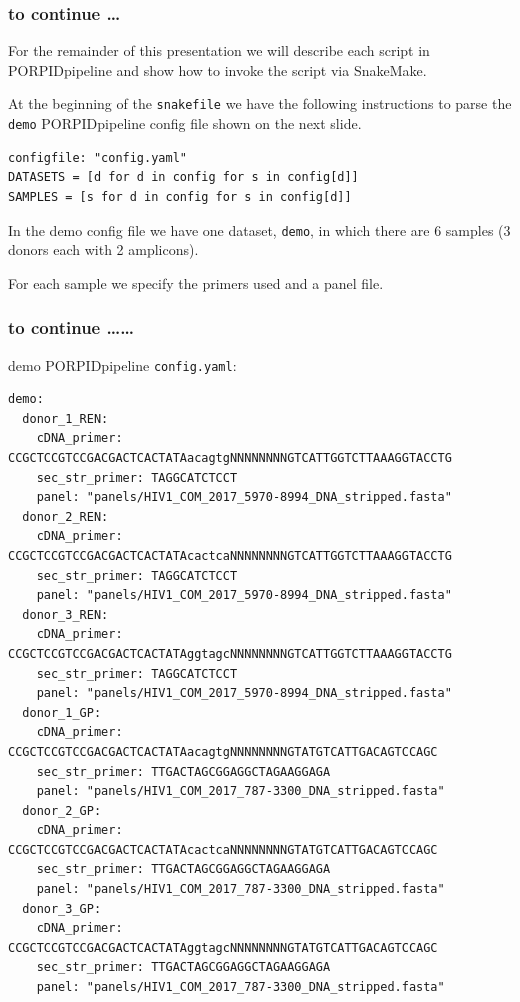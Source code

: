 \documentclass{beamer}
\begin{document}
\begin{frame}[fragile]
\frametitle{to continue \ldots }

\alert<1> 

For the remainder of this presentation we will describe each
script in PORPIDpipeline and show how to invoke
the script via SnakeMake.

\bigskip
At the beginning of the {\tt snakefile} we have the following instructions 
to parse the {\tt demo} PORPIDpipeline config file shown on the next slide.

\begin{tiny}
\begin{verbatim}
configfile: "config.yaml"
DATASETS = [d for d in config for s in config[d]]
SAMPLES = [s for d in config for s in config[d]] 
\end{verbatim}
\end{tiny}

\bigskip
In the demo config file we have one dataset, {\tt demo}, in which there
are 6 samples (3 donors each with 2 amplicons).

\bigskip
For each sample we specify the primers used and a panel file.

\end{frame}

\begin{frame}[fragile]
\frametitle{to continue \ldots  \ldots}

\alert<1> 

demo PORPIDpipeline  {\tt config.yaml}:

\begin{tiny}
\begin{verbatim}
demo:
  donor_1_REN:
    cDNA_primer: CCGCTCCGTCCGACGACTCACTATAacagtgNNNNNNNNGTCATTGGTCTTAAAGGTACCTG
    sec_str_primer: TAGGCATCTCCT
    panel: "panels/HIV1_COM_2017_5970-8994_DNA_stripped.fasta"
  donor_2_REN:
    cDNA_primer: CCGCTCCGTCCGACGACTCACTATAcactcaNNNNNNNNGTCATTGGTCTTAAAGGTACCTG
    sec_str_primer: TAGGCATCTCCT
    panel: "panels/HIV1_COM_2017_5970-8994_DNA_stripped.fasta"
  donor_3_REN:
    cDNA_primer: CCGCTCCGTCCGACGACTCACTATAggtagcNNNNNNNNGTCATTGGTCTTAAAGGTACCTG
    sec_str_primer: TAGGCATCTCCT
    panel: "panels/HIV1_COM_2017_5970-8994_DNA_stripped.fasta"
  donor_1_GP:
    cDNA_primer: CCGCTCCGTCCGACGACTCACTATAacagtgNNNNNNNNGTATGTCATTGACAGTCCAGC
    sec_str_primer: TTGACTAGCGGAGGCTAGAAGGAGA
    panel: "panels/HIV1_COM_2017_787-3300_DNA_stripped.fasta"
  donor_2_GP:
    cDNA_primer: CCGCTCCGTCCGACGACTCACTATAcactcaNNNNNNNNGTATGTCATTGACAGTCCAGC
    sec_str_primer: TTGACTAGCGGAGGCTAGAAGGAGA
    panel: "panels/HIV1_COM_2017_787-3300_DNA_stripped.fasta"
  donor_3_GP:
    cDNA_primer: CCGCTCCGTCCGACGACTCACTATAggtagcNNNNNNNNGTATGTCATTGACAGTCCAGC
    sec_str_primer: TTGACTAGCGGAGGCTAGAAGGAGA
    panel: "panels/HIV1_COM_2017_787-3300_DNA_stripped.fasta"
\end{verbatim}
\end{tiny}

\end{frame}
\end{document}

